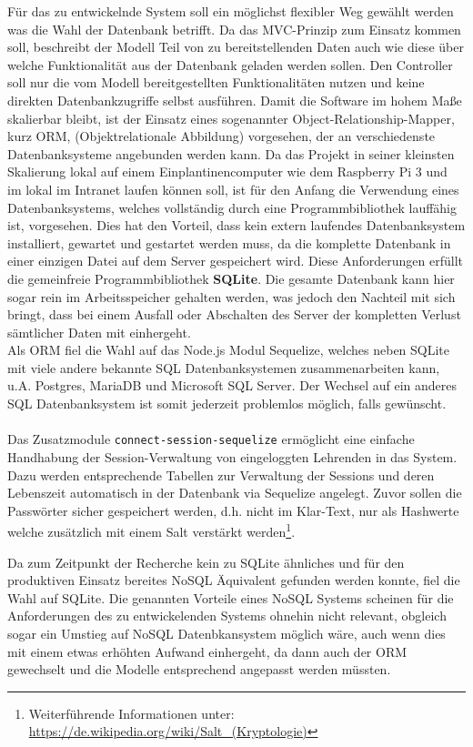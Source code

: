 Für das zu entwickelnde System soll ein möglichst flexibler Weg gewählt werden was die Wahl der Datenbank betrifft. Da das MVC-Prinzip zum Einsatz kommen soll, beschreibt der Modell Teil von zu bereitstellenden Daten auch wie diese über welche Funktionalität aus der Datenbank geladen werden sollen. Den Controller soll nur die vom Modell bereitgestellten Funktionalitäten nutzen und keine direkten Datenbankzugriffe selbst ausführen. Damit die Software im hohem Maße skalierbar bleibt, ist der Einsatz eines sogenannter Object-Relationship-Mapper, kurz ORM, (Objektrelationale Abbildung) vorgesehen, der an verschiedenste Datenbanksysteme angebunden werden kann. Da das Projekt in seiner kleinsten Skalierung lokal auf einem Einplantinencomputer wie dem Raspberry Pi 3 und im lokal im Intranet laufen können soll, ist für den Anfang die Verwendung eines Datenbanksystems, welches vollständig durch eine Programmbibliothek lauffähig ist, vorgesehen. Dies hat den Vorteil, dass kein extern laufendes Datenbanksystem installiert, gewartet und gestartet werden muss, da die komplette Datenbank in einer einzigen Datei auf dem Server gespeichert wird. Diese Anforderungen erfüllt die gemeinfreie Programmbibliothek \textbf{SQLite}. Die gesamte Datenbank kann hier sogar rein im Arbeitsspeicher gehalten werden, was jedoch den Nachteil mit sich bringt, dass bei einem Ausfall oder Abschalten des Server der kompletten Verlust sämtlicher Daten mit einhergeht. 
\\ Als ORM fiel die Wahl auf das Node.js Modul Sequelize, welches neben SQLite mit viele andere bekannte SQL Datenbanksystemen zusammenarbeiten kann, u.A. Postgres, MariaDB und Microsoft SQL Server. Der Wechsel auf ein anderes SQL Datenbanksystem ist somit jederzeit problemlos möglich, falls gewünscht. \\ \\  

Das Zusatzmodule \texttt{connect-session-sequelize} ermöglicht eine einfache Handhabung der Session-Verwaltung von eingeloggten Lehrenden in das System. Dazu werden entsprechende Tabellen zur Verwaltung der Sessions und deren Lebenszeit automatisch in der Datenbank  via Sequelize angelegt. Zuvor sollen die Passwörter sicher gespeichert werden, d.h. nicht im Klar-Text, nur als Hashwerte welche zusätzlich mit einem Salt verstärkt werden\footnote{Weiterführende Informationen unter:  \url{https://de.wikipedia.org/wiki/Salt_(Kryptologie)}}.

Da zum Zeitpunkt der Recherche kein zu SQLite ähnliches und für den produktiven Einsatz bereites NoSQL Äquivalent gefunden werden konnte, fiel die Wahl auf SQLite. Die genannten Vorteile eines NoSQL Systems scheinen für die Anforderungen des zu entwickelenden Systems ohnehin nicht relevant, obgleich sogar ein Umstieg auf NoSQL Datenbkansystem möglich wäre, auch wenn dies mit einem etwas erhöhten Aufwand einhergeht, da dann auch der ORM gewechselt und die Modelle entsprechend angepasst werden müssten.  

